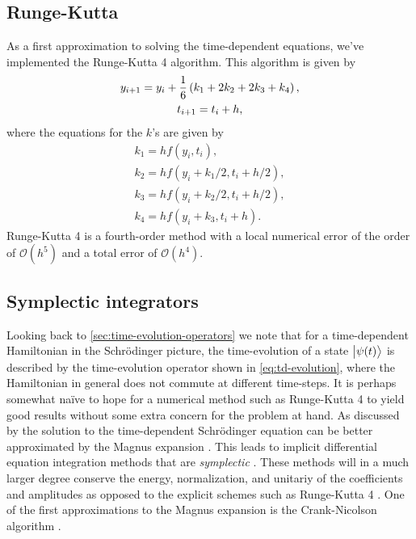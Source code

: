         \subsection{Runge-Kutta}
            As a first approximation to solving the time-dependent equations,
            we've implemented the Runge-Kutta 4 algorithm.
            This algorithm is given by \cite{morken2017notes}
            \begin{gather}
                y_{i + 1} = y_i + \frac{1}{6}\left( 
                    k_1 + 2 k_2 + 2 k_3 + k_4
                 \right), \\
                t_{i + 1} = t_i + h,
            \end{gather}
            where the equations for the $k$'s are given by
            \begin{gather}
                k_1 = h f(y_i, t_i), \\
                k_2 = h f(y_i + k_1 / 2, t_i + h / 2), \\
                k_3 = h f(y_i + k_2 / 2, t_i + h / 2), \\
                k_4 = h f(y_i + k_3, t_i + h).
            \end{gather}
            Runge-Kutta 4 is a fourth-order method with a local numerical error
            of the order of $\mathcal{O}(h^5)$ and a total error of
            $\mathcal{O}(h^4)$.

        \subsection{Symplectic integrators}
            Looking back to \autoref{sec:time-evolution-operators} we note that
            for a time-dependent Hamiltonian in the Schrödinger picture, the
            time-evolution of a state $\ket{\psi(t)}$ is described by the
            time-evolution operator shown in \autoref{eq:td-evolution}, where
            the Hamiltonian in general does not commute at different time-steps.
            It is perhaps somewhat naïve to hope for a numerical method such as
            Runge-Kutta 4 to yield good results without some extra concern for
            the problem at hand.
            As discussed by \citeauthor{joshua-magnus} \cite{joshua-magnus} the
            solution to the time-dependent Schrödinger equation can be better
            approximated by the Magnus expansion \cite{magnus-expansion}.
            This leads to implicit differential equation integration methods
            that are \emph{symplectic} \cite{joshua-magnus}.
            These methods will in a much larger degree conserve the energy,
            normalization, and unitariy of the coefficients and amplitudes as
            opposed to the explicit schemes such as Runge-Kutta 4
            \cite{joshua-magnus, pedersen2018symplectic}.
            One of the first approximations to the Magnus expansion is the
            Crank-Nicolson algorithm \cite{ullrich2011time, joshua-magnus}.



